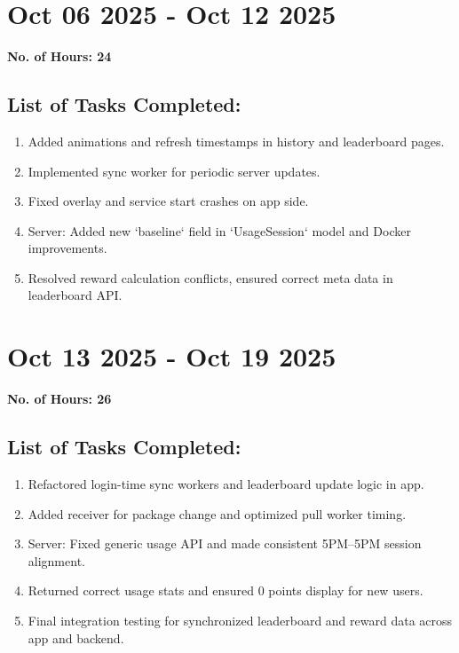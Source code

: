 \documentclass[12pt]{article}
\begin{document}
    \section{Oct 06 2025 - Oct 12 2025}
    {\bf No. of Hours: 24}
    \subsection{List of Tasks Completed:}
    \begin{enumerate}
        \item Added animations and refresh timestamps in history and leaderboard pages.
        \item Implemented sync worker for periodic server updates.
        \item Fixed overlay and service start crashes on app side.
        \item Server: Added new `baseline` field in `UsageSession` model and Docker improvements.
        \item Resolved reward calculation conflicts, ensured correct meta data in leaderboard API.
    \end{enumerate}
    
    \section{Oct 13 2025 - Oct 19 2025}
    {\bf No. of Hours: 26}
    \subsection{List of Tasks Completed:}
    \begin{enumerate}
        \item Refactored login-time sync workers and leaderboard update logic in app.
        \item Added receiver for package change and optimized pull worker timing.
        \item Server: Fixed generic usage API and made consistent 5PM–5PM session alignment.
        \item Returned correct usage stats and ensured 0 points display for new users.
        \item Final integration testing for synchronized leaderboard and reward data across app and backend.
    \end{enumerate}
\end{document}
